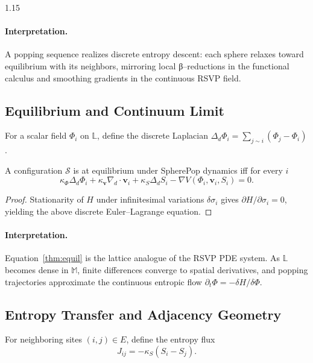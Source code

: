 \documentclass[12pt,a4paper]{article}
\begin{document}
\begin{spacing}{1.15}
\paragraph{Interpretation.}
A popping sequence realizes discrete entropy descent:
each sphere relaxes toward equilibrium with its neighbors,
mirroring local β--reductions in the functional calculus
and smoothing gradients in the continuous RSVP field.

\subsection{Equilibrium and Continuum Limit}

\begin{definition}
\label{def:laplacian}
For a scalar field $\Phi_i$ on $\mathbb{L}$,
define the discrete Laplacian
$\Delta_d\Phi_i = \sum_{j\sim i} (\Phi_j - \Phi_i)$.
\end{definition}

\begin{theorem}
\label{thm:equil}
A configuration $\mathcal{S}$ is at equilibrium under SpherePop dynamics
iff for every $i$
\[
  \kappa_\Phi \Delta_d \Phi_i
  +\kappa_{\mathbf{v}} \nabla_d\!\cdot\!\mathbf{v}_i
  +\kappa_S \Delta_d S_i
  - \nabla V(\Phi_i,\mathbf{v}_i,S_i) = 0.
\]
\end{theorem}

\begin{proof}
Stationarity of $H$ under infinitesimal variations
$\delta\sigma_i$ gives $\partial H/\partial\sigma_i=0$,
yielding the above discrete Euler--Lagrange equation.
\end{proof}

\paragraph{Interpretation.}
Equation~\eqref{thm:equil} is the lattice analogue of the RSVP PDE system.
As $\mathbb{L}$ becomes dense in $\mathbb{M}$,
finite differences converge to spatial derivatives,
and popping trajectories approximate
the continuous entropic flow $\partial_t\Phi=-\delta H/\delta\Phi$.

\subsection{Entropy Transfer and Adjacency Geometry}

\begin{definition}
\label{def:flux}
For neighboring sites $(i,j)\in E$, define the entropy flux
\[
  J_{ij} = -\kappa_S (S_i - S_j).
\]
\end{definition}


\end{spacing}
\end{document}
